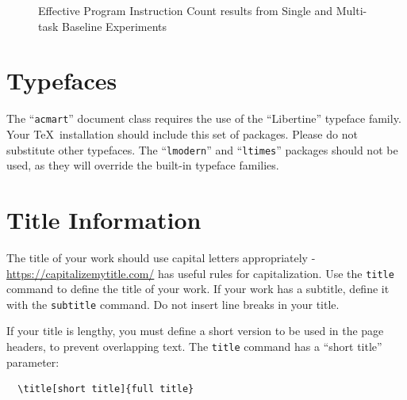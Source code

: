 \documentclass[sigconf]{acmart}
\begin{document}
{\begin{figure}[t]
    
    \caption{Effective Program Instruction Count results from Single and Multi-task Baseline Experiments}
    \label{fig:effective_program}
  \end{figure}

  \clearpage
}

\section{Typefaces}

The ``\verb|acmart|'' document class requires the use of the
``Libertine'' typeface family. Your \TeX\ installation should include
this set of packages. Please do not substitute other typefaces. The
``\verb|lmodern|'' and ``\verb|ltimes|'' packages should not be used,
as they will override the built-in typeface families.

\section{Title Information}

The title of your work should use capital letters appropriately -
\url{https://capitalizemytitle.com/} has useful rules for
capitalization. Use the {\verb|title|} command to define the title of
your work. If your work has a subtitle, define it with the
{\verb|subtitle|} command.  Do not insert line breaks in your title.

If your title is lengthy, you must define a short version to be used
in the page headers, to prevent overlapping text. The \verb|title|
command has a ``short title'' parameter:
\begin{verbatim}
  \title[short title]{full title}
\end{verbatim}
\end{document}
